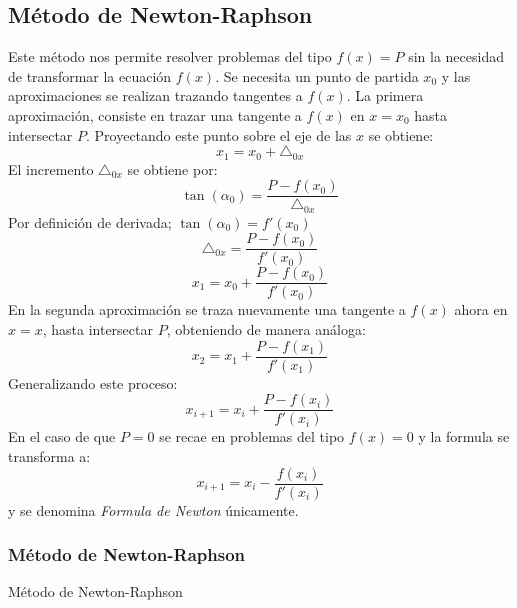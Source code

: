 \subsection{Método de Newton-Raphson}
Este método nos permite resolver problemas del tipo $f(x)=P$ sin la necesidad de transformar la ecuación $f(x)$. Se necesita un punto de partida $x_0$ y las aproximaciones se realizan trazando tangentes a $f(x)$.
La primera aproximación, consiste en trazar una tangente a $f(x)$ en $x=x_0$ hasta intersectar $P$. Proyectando este punto sobre el eje de las $x$ se obtiene:
$$x_1 = x_0 + \triangle_{0x}$$
El incremento $\triangle_{0x}$ se obtiene por:
$$\tan(\alpha_0)=\dfrac{P-f(x_0)}{\triangle_{0x}}$$
Por definición de derivada; $\tan(\alpha_0)=f'(x_0)$
$$\triangle_{0x}=\dfrac{P-f(x_0)}{f'(x_0)}$$
$$x_1 = x_0 + \dfrac{P-f(x_0)}{f'(x_0)}$$
En la segunda aproximación se traza nuevamente una tangente a $f(x)$ ahora en $x=x$, hasta intersectar $P$, obteniendo de manera análoga:
$$x_2 = x_1 + \dfrac{P-f(x_1)}{f'(x_1)}$$
Generalizando este proceso:
$$x_{i+1} = x_i + \dfrac{P-f(x_i)}{f'(x_i)}$$
En el caso de que $P=0$ se recae en problemas del tipo $f(x)=0$ y la formula se transforma a:
$$x_{i+1} = x_i - \dfrac{f(x_i)}{f'(x_i)}$$
y se denomina \textit{Formula de Newton} únicamente.
\subsubsection{Método de Newton-Raphson}
\begin{algorithm}[ht]
 \caption{Método de Newton-Raphson}
\end{algorithm} 